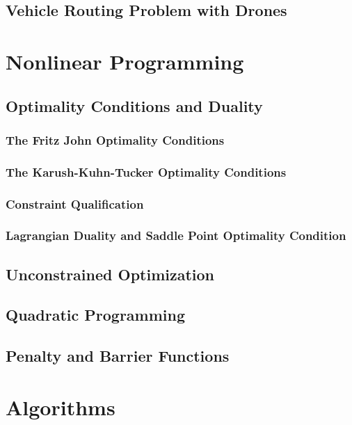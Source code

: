 		\chapter{Vehicle Routing Problem with Drones}

	\part{Nonlinear Programming}\label{Nonlinear}
		\chapter{Optimality Conditions and Duality}
			\section{The Fritz John Optimality Conditions}

			\section{The Karush-Kuhn-Tucker Optimality Conditions}

			\section{Constraint Qualification}

			\section{Lagrangian Duality and Saddle Point Optimality Condition}

		\chapter{Unconstrained Optimization}

		\chapter{Quadratic Programming}

		\chapter{Penalty and Barrier Functions}

	\part{Algorithms}\label{Algo}
